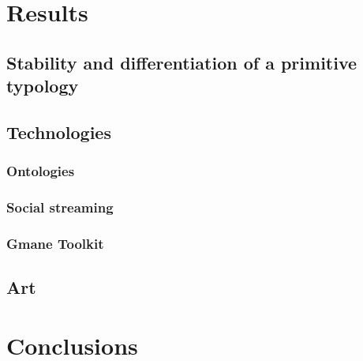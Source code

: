 \documentclass{article}
\begin{document}
    \section{Results}
    \subsection{Stability and differentiation of a primitive typology}
    \subsection{Technologies}
    \subsubsection{Ontologies}
    \subsubsection{Social streaming}
    \subsubsection{Gmane Toolkit}
    \subsection{Art}
    \section{Conclusions}

%            
%            
%                    
%                            
%                    
%		    
%                
%        
%        
%        
    
  
\end{document}
